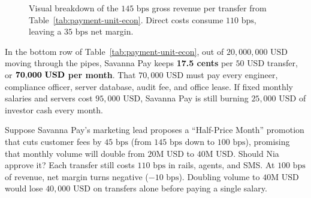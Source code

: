 \begin{figure}[htbp]
\centering
{}
\caption{Visual breakdown of the $145\text{ bps}$ gross revenue per transfer from Table~\ref{tab:payment-unit-econ}. Direct costs consume $110\text{ bps}$, leaving a $35\text{ bps}$ net margin.}
\label{fig:unit-econ-bar}
\end{figure}

In the bottom row of Table~\ref{tab:payment-unit-econ}, out of $20{,}000{,}000\text{ USD}$ moving through the pipes, Savanna Pay keeps \textbf{17.5 cents} per $50\text{ USD}$ transfer, or $\mathbf{70{,}000\text{ \textbf{USD}}}$ \textbf{per month}. That $70{,}000\text{ USD}$ must pay every engineer, compliance officer, server database, audit fee, and office lease. If fixed monthly salaries and servers cost $95{,}000\text{ USD}$, Savanna Pay is still burning $25{,}000\text{ USD}$ of investor cash every month.

\begin{walkbox}
Suppose Savanna Pay's marketing lead proposes a ``Half-Price Month'' promotion that cuts customer fees by $45\text{ bps}$ (from $145\text{ bps}$ down to $100\text{ bps}$), promising that monthly volume will double from $20\text{M USD}$ to $40\text{M USD}$. Should Nia approve it? Each transfer still costs $110\text{ bps}$ in rails, agents, and SMS. At $100\text{ bps}$ of revenue, net margin turns negative ($-10\text{ bps}$). Doubling volume to $40\text{M USD}$ would lose $40{,}000\text{ USD}$ on transfers alone before paying a single salary.
\end{walkbox}

